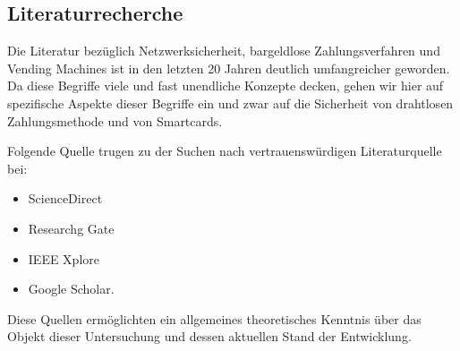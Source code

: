 \subsection{Literaturrecherche}

Die Literatur bezüglich Netzwerksicherheit, bargeldlose Zahlungsverfahren und Vending Machines ist in den 
letzten 20 Jahren deutlich umfangreicher geworden. Da diese Begriffe viele und fast unendliche Konzepte 
decken, gehen wir hier auf spezifische Aspekte dieser Begriffe ein und zwar auf die Sicherheit von drahtlosen 
Zahlungsmethode und von Smartcards. 

Folgende Quelle trugen zu der Suchen nach vertrauenswürdigen Literaturquelle bei:

\begin{itemize}
    \item ScienceDirect
    \item Researchg Gate
    \item IEEE Xplore
    \item Google Scholar.
\end{itemize}

Diese Quellen ermöglichten ein allgemeines theoretisches Kenntnis über das Objekt dieser Untersuchung und dessen aktuellen 
Stand der Entwicklung.
